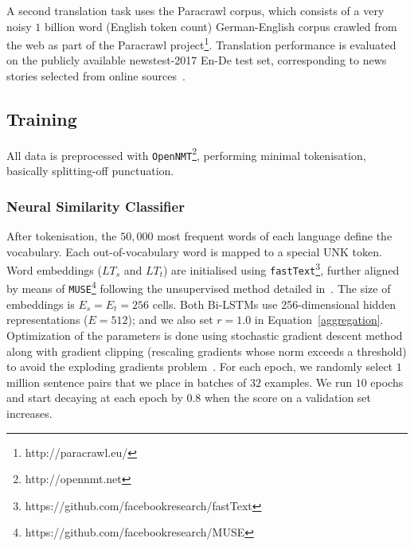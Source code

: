 \documentclass[11pt,a4paper]{article}
\begin{document}
A second translation task uses the Paracrawl corpus, which consists of
a very noisy $1$ billion word (English token count) German-English
corpus crawled from the web as part of the Paracrawl
project\footnote{http://paracrawl.eu/}. Translation performance is evaluated on the publicly available newstest-2017 En-De test set, corresponding to news stories selected from online sources~\cite{W17-4717}.


\subsection{Training}

All data is preprocessed with \texttt{OpenNMT}\footnote{http://opennmt.net}, performing minimal tokenisation, basically splitting-off punctuation.

\subsubsection{Neural Similarity Classifier}
\label{divergence}

After tokenisation, the $50,000$ most frequent words of each language
define the vocabulary.
Each out-of-vocabulary word is mapped to a special UNK token.
Word embeddings ($LT_s$ and $LT_t$) are initialised using \texttt{fastText}\footnote{https://github.com/facebookresearch/fastText}, further aligned by means of \texttt{MUSE}\footnote{https://github.com/facebookresearch/MUSE} following the unsupervised method detailed in~\cite{lample2018word}. 
The size of embeddings is $E_s=E_t=256$ cells. 
Both Bi-LSTMs use 256-dimensional hidden representations ($E=512$); and
we also set $r=1.0$ in Equation~\eqref{aggregation}.
Optimization of the parameters is done using stochastic gradient descent method along with gradient clipping (rescaling gradients whose norm exceeds a threshold) to avoid the exploding gradients problem~\cite{Pascanu:2013:DTR:3042817.3043083}. 
For each epoch, we randomly select $1$ million sentence pairs that we
place in batches of $32$ examples. We run $10$ epochs and start decaying at each epoch by $0.8$ when the
score on a validation set increases. 
\end{document}
